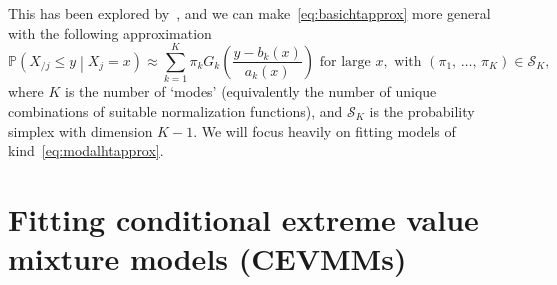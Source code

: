 \documentclass[11pt,twoside,openany]{book}
\newcommand{\prob}{\mathbb{P}}
\numberwithin{Theorem}{chapter}
\numberwithin{Definition}{chapter}
\numberwithin{Lemma}{chapter}
\numberwithin{Algorithm}{chapter}
\numberwithin{equation}{chapter}
\begin{document}
This has been explored
by~\cite{tendijck2021modeling}, and
we can make~\eqref{eq:basichtapprox} more general with the following approximation
\begin{equation}\label{eq:modalhtapprox}
  \prob\left(X_{/j}\leq y\middle| X_{j} = x\right)
  \approx \sum_{k=1}^K \pi_k G_k\left(\frac{y - b_k(x)}{a_k(x)}\right)
\text{ for large }x,
\text{ with }(\pi_1,\,\ldots,\,\pi_K)\in \mathcal{S}_{K},
\end{equation}
where $K$ is the number of `modes' (equivalently the number of unique
combinations of suitable normalization functions), and $\mathcal{S}_K$ is the
probability simplex with dimension $K-1$. We will focus
heavily on fitting models of kind~\eqref{eq:modalhtapprox}.

\FloatBarrier

\section{Fitting conditional extreme value mixture models (CEVMMs)}
\end{document}
